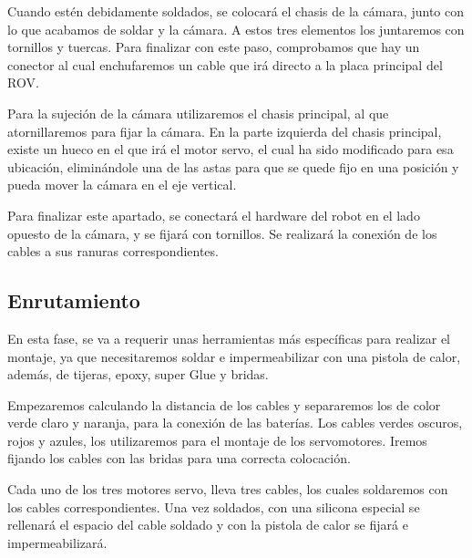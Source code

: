 Cuando estén debidamente soldados, se colocará el chasis de la cámara, junto con lo que acabamos de soldar y la cámara. A estos tres elementos los juntaremos con tornillos y tuercas. Para finalizar con este paso, comprobamos que hay un conector al cual enchufaremos un cable que irá directo a la placa principal del ROV.

Para la sujeción de la cámara utilizaremos el chasis principal, al que atornillaremos para fijar la cámara. En la parte izquierda del chasis principal, existe un hueco en el que irá el motor servo, el cual ha sido modificado para esa ubicación, eliminándole una de las astas para que se quede fijo en una posición y pueda mover la cámara en el eje vertical.

Para finalizar este apartado, se conectará el hardware del robot en el lado opuesto de la cámara, y se fijará con tornillos. Se realizará la conexión de los cables a sus ranuras correspondientes.

\subsection{Enrutamiento}
\label{subsec:enrutamiento}

En esta fase, se va a requerir unas herramientas más específicas para realizar el montaje, ya que necesitaremos soldar e impermeabilizar con una pistola de calor, además, de tijeras, epoxy, super Glue y bridas.

Empezaremos calculando la distancia de los cables y separaremos los de color verde claro y naranja, para la conexión de las baterías. Los cables verdes oscuros, rojos y azules, los utilizaremos para el montaje de los servomotores. Iremos fijando los cables con las bridas para una correcta colocación.

Cada uno de los tres motores servo, lleva tres cables, los cuales soldaremos con los cables correspondientes. Una vez soldados, con una silicona especial se rellenará el espacio del cable soldado y con la pistola de calor se fijará e impermeabilizará.

